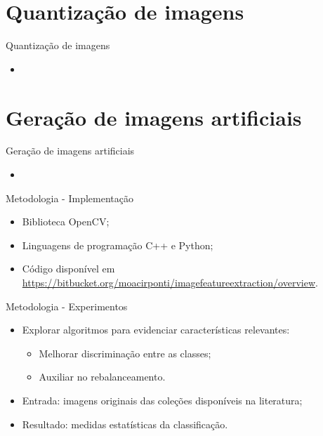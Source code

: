 \documentclass{beamer}
\begin{document}
\section{Quantização de imagens}
\begin{frame}{Quantização de imagens}
\setlength\leftmargini{1em}
\begin{block}{}
\justifying
\begin{itemize}
\item
\end{itemize}
\end{block}
\end{frame}
\section{Geração de imagens artificiais}
\begin{frame}{Geração de imagens artificiais}
\setlength\leftmargini{1em}
\begin{block}{}
\justifying
\begin{itemize}
\item
\end{itemize}
\end{block}
\end{frame}
\begin{frame}{Metodologia - Implementação}
\setlength\leftmargini{1em}
\begin{block}{}
\justifying
\begin{itemize}
\item Biblioteca OpenCV; %
\item Linguagens de programação C++ e Python;
\item Código disponível em \footnotesize{\url{https://bitbucket.org/moacirponti/imagefeatureextraction/overview}}.
\end{itemize}
\end{block}
\end{frame}
\begin{frame}{Metodologia - Experimentos}
\setlength\leftmargini{1em}
\begin{block}{}
\justifying
\begin{itemize}
\item Explorar algoritmos para evidenciar características relevantes:
\begin{itemize}
\item Melhorar discriminação entre as classes;
\item Auxiliar no rebalanceamento.
\end{itemize}
\item Entrada: imagens originais das coleções disponíveis na literatura;
\item Resultado: medidas estatísticas da classificação.
\end{itemize}
\end{block}
\end{frame}
\end{document}
